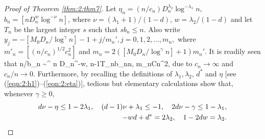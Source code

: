  \begin{proof}[Proof of Theorem \ref {thm:2:thm7}]
Let $\eta_n=(n/c_n)D_n^{\lambda_2}\log^{-\lambda_1}n,$ $b_n = [nD_n^w\log^{-\nu}n]$, where $\nu = (\lambda_1+1)/(1-d)$, $w = \lambda_2 / (1 - d)$ and let $T_n$ be the largest integer $s$ such that $s b_n \le n$. Also write  $y_j = -[M_0D_n/\log^{\gamma}n] - 1 +  j/  m_n',  j = 0,1,2,...,m_n,$ where $m'_n = [(n/c_n)^{1/2} c_n^2]$ and $m_n= 2([M_0D_n/\log^{\gamma}n]+1)m_n'$. It is readily seen that
\be
n/b_n \sim \log^{\nu} n D_n^{-w}, \quad n-1\le T_nb_n\le n, \quad m_n\le Cn^2, 
\ee
due to $c_n\to\infty$ and $c_n/n\to 0$. Furthermore, by recalling the definitions of $\lambda_1, \lambda_2$, $d^*$ and $\eta$ [see (\ref {eqn:2:h1})--(\ref {eqn:2:eta})], tedious but elementary calculations show that, whenever $\gamma\ge 0$,
\begin{align}
d\nu-\eta \le 1-2\lambda_1, \quad (d-1)\nu+\lambda_1\le -1, \quad 2d\nu-\gamma\le 1-\lambda_1, \la {eqn:2:112}  \\
-wd + d^* = 2\lambda_2,  \quad 1 - 2dw= \lambda_2. \la{112.1}
\end{align}


\end{proof}
